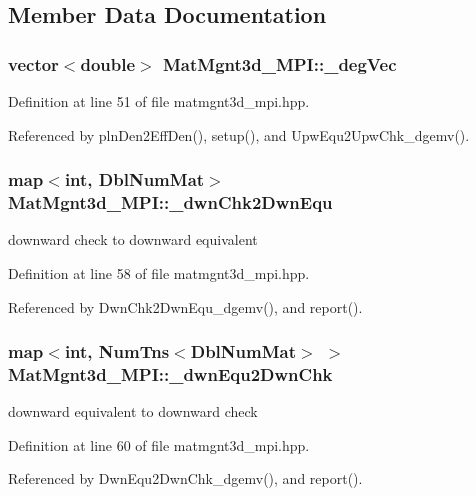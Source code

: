 \subsection{Member Data Documentation}
\subsubsection{\setlength{\rightskip}{0pt plus 5cm}vector$<$double$>$ {\bf Mat\-Mgnt3d\_\-MPI::\_\-deg\-Vec}}\label{classMatMgnt3d__MPI_7a8804dd4c063a2060da6494c8815b6b_7a8804dd4c063a2060da6494c8815b6b}




Definition at line 51 of file matmgnt3d\_\-mpi.hpp.

Referenced by pln\-Den2Eff\-Den(), setup(), and Upw\-Equ2Upw\-Chk\_\-dgemv().
\subsubsection{\setlength{\rightskip}{0pt plus 5cm}map$<$int, Dbl\-Num\-Mat$>$ {\bf Mat\-Mgnt3d\_\-MPI::\_\-dwn\-Chk2Dwn\-Equ}}\label{classMatMgnt3d__MPI_b9f0f9702035e0fc0ef0790827f5d059_b9f0f9702035e0fc0ef0790827f5d059}


downward check to downward equivalent 

Definition at line 58 of file matmgnt3d\_\-mpi.hpp.

Referenced by Dwn\-Chk2Dwn\-Equ\_\-dgemv(), and report().
\subsubsection{\setlength{\rightskip}{0pt plus 5cm}map$<$int, Num\-Tns$<$Dbl\-Num\-Mat$>$ $>$ {\bf Mat\-Mgnt3d\_\-MPI::\_\-dwn\-Equ2Dwn\-Chk}}\label{classMatMgnt3d__MPI_9dda4a0f7503a36d6e846d77ca1289d7_9dda4a0f7503a36d6e846d77ca1289d7}


downward equivalent to downward check 

Definition at line 60 of file matmgnt3d\_\-mpi.hpp.

Referenced by Dwn\-Equ2Dwn\-Chk\_\-dgemv(), and report().
